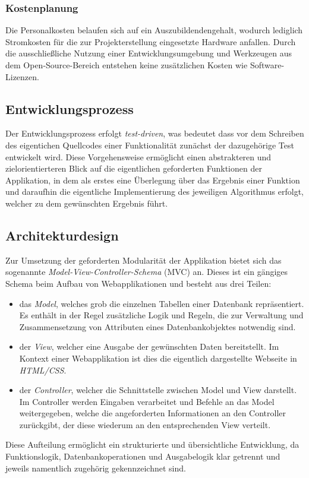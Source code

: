 \subsubsection{Kostenplanung}
\label{sec:Kostenplanung}
Die Personalkosten belaufen sich auf ein Auszubildendengehalt, wodurch lediglich Stromkosten für die
zur Projekterstellung eingesetzte Hardware anfallen. Durch die ausschließliche Nutzung einer
Entwicklungsumgebung und Werkzeugen aus dem Open-Source-Bereich entstehen keine zusätzlichen Kosten
wie Software-Lizenzen.

\subsection{Entwicklungsprozess}
\label{sec:Entwicklungsprozess}
Der Entwicklungsprozess erfolgt \textit{test-driven}, was bedeutet dass vor dem Schreiben des eigentichen
Quellcodes einer Funktionalität zunächst der dazugehörige Test entwickelt wird. Diese Vorgehensweise
ermöglicht einen abstrakteren und zielorientierteren Blick auf die eigentlichen geforderten
Funktionen der Applikation, in dem als erstes eine Überlegung über das Ergebnis einer Funktion
und daraufhin die eigentliche Implementierung des jeweiligen Algorithmus erfolgt, welcher zu dem
gewünschten Ergebnis führt.

\subsection{Architekturdesign}
\label{sec:Architekturdesign}
Zur Umsetzung der geforderten Modularität der Applikation bietet sich das sogenannte
\textit{Model-View-Controller-Schema} (\acs{MVC}) an. Dieses ist ein gängiges Schema beim Aufbau von Webapplikationen und
besteht aus drei Teilen:
\begin{itemize}
	\item das \textit{Model}, welches grob die einzelnen Tabellen einer Datenbank repräsentiert. Es enthält in
	der Regel zusätzliche Logik und Regeln, die zur Verwaltung und Zusammensetzung von Attributen
	eines Datenbankobjektes notwendig sind.
	\item der \textit{View}, welcher eine Ausgabe der gewünschten Daten bereitstellt. Im Kontext einer
	Webapplikation ist dies die eigentlich dargestellte Webseite in \textit{HTML/CSS}.
	\item der \textit{Controller}, welcher die Schnittstelle zwischen Model und View darstellt.
	Im Controller werden Eingaben verarbeitet und Befehle an das Model weitergegeben, welche
	die angeforderten Informationen an den Controller zurückgibt, der diese wiederum an den
	entsprechenden View verteilt.
\end{itemize}
Diese Aufteilung ermöglicht ein strukturierte und übersichtliche Entwicklung, da Funktionslogik,
Datenbankoperationen und Ausgabelogik klar getrennt und jeweils namentlich zugehörig gekennzeichnet
sind.

